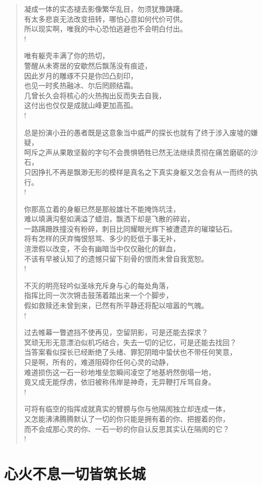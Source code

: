 \documentclass[UTF8, 12pt, a4paper]{ctexrep} %
\begin{document}
\begin{verse}
凝成一体的实态褪去影像繁华乱目，勿须犹豫踌躇。\\
有太多悲哀无法改变扭转，哪怕心意如何代价可供。\\
所以现实啊，唯我的中心恐怕逃避也不会明白付出。\\!

唯有躯壳丰满了你的热切，\\
警醒从未寄居的安歇然后飘荡没有痕迹，\\
因此岁月的雕琢不只是你凹凸刻印，\\
也见一时炙热融冰、尔后罔顾结霜。\\
几曾长久会将核心的火热掏出反而失去自我，\\
这付出也仅仅是成就山峰更加高孤。\\!

总是扮演小丑的愚者既是这意象当中威严的探长也就有了终于涉入废墟的嫌疑，\\
呵斥之声从果敢坚毅的字句不会畏惧牺牲已然无法继续贯彻在痛苦磨砺的沙石，\\
只因挣扎不再是飘渺无形的模样是真名之下真实身躯又怎会有从一而终的执行。\\!

你那高立着的身躯已然是那般雄壮不能掩饰坑洼，\\
难以填满沟壑如满溢了蜡泪，飘洒下却是飞散的碎岩，\\
一路蹒跚跌撞没有粉碎，刺目比同耀眼光辉下被遭遗弃的璀璨钻石。\\
将有怎样的厌弃悔恨怒骂、多少的贬低于事无补，\\
渲泄假以改变，不会有幽暗当中仅仅融化的鲜血，\\
不该有早被认知了的遗憾只留下刻骨的恨而未曾自我宽恕。\\!

不灭的明亮轻吟似圣咏充斥身与心的每处角落，\\
指挥比同一次次锵击鼓荡着踏出来一个个脚步，\\
假如救赎还未曾到来，已然有所平静还将配以喧嚣的气魄。\\!

过去帷幕一瞥遮挡不使再见，空留阴影，可是还能去探求？\\
冥顽无形无意漂泊似机巧结合，失去一切的记忆，可是还能去找回？\\
当答案看似探长已经断绝了头绪、罪犯阴暗中蛰伏也不带任何笑意，\\
只是啊，所有的，难道阻碍你任何心灵的动静，\\
难道损伤这一石一砂地堆垒忽瞬间凌空了地基坍然倒塌一地，\\
竟又成无能俘虏，依旧被称伟岸是神奇，无异鞭打斥骂自身。\\!

可将有临空的指挥成就真实的臂膀与你与他隔阂独立却连成一体，\\
又怎能沸沸腾腾默认了一切的你只能是拥有着的你、把握着的你，\\
而不会成那心灵的你、一石一砂的你自认反思其实认在隔阂的它？\\!

\end{verse}



\section*{心火不息一切皆筑长城}
\newpage
\end{document}
